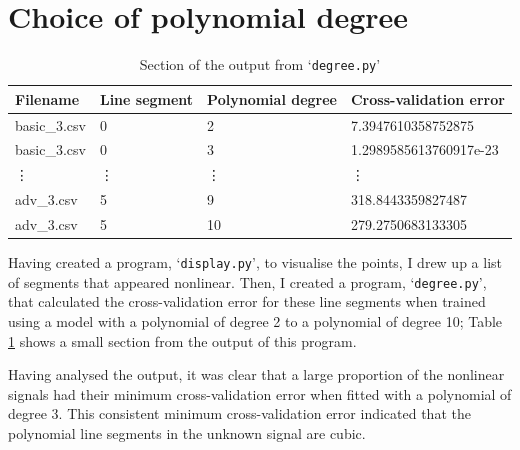 \documentclass[onecolumn, 12pt, a4paper]{article}
\begin{document}
\section{Choice of polynomial degree}

\begin{table}[htbp]
    \begin{center}
        \caption{\label{tab:degree.py}Section of the output from `\texttt{degree.py}'}
    \begin{tabular}{l l l l} 
        \hline\hline
        Filename & Line segment & Polynomial degree & Cross-validation error \\ [0.5ex] 
        \hline
        basic\_3.csv & 0 & 2 & 7.3947610358752875 \\ 
        basic\_3.csv & 0 & 3 & 1.2989585613760917e-23 \\
        \vdots & \vdots & \vdots & \vdots \\
        adv\_3.csv & 5 & 9 & 318.8443359827487 \\
        adv\_3.csv & 5 & 10 & 279.2750683133305 \\
        \hline
    \end{tabular}
    \end{center}
\end{table}

Having created a program, `\texttt{display.py}', to visualise
the points, I drew up a list of segments that appeared 
nonlinear.
Then, I created a program, `\texttt{degree.py}', that calculated
the cross-validation error for these line segments
when trained using a model with a polynomial of degree 2
to a polynomial of degree 10; Table \ref{tab:degree.py}
shows a small section from the output of this program.

Having analysed the output, it was clear that a large
proportion of the nonlinear signals had their minimum
cross-validation error when fitted with a polynomial of degree
3.
This consistent minimum cross-validation error indicated
that the polynomial line segments in the unknown signal are cubic.
\end{document}
